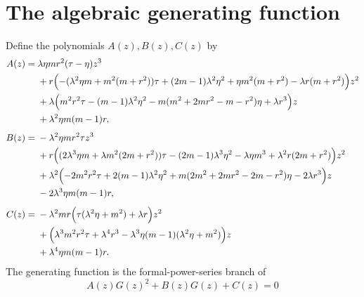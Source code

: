 \documentclass[11pt]{article}
\theoremstyle{remark}
\begin{document}
\section{The algebraic generating function}
\label{sec:algebraic-gf}


Define the polynomials $A(z),B(z),C(z)$ by
\begin{align}
 A(z)={}&\lambda\eta mr^2(\tau-\eta)z^3 \\
 &+r\Bigl(-(\lambda^2\eta m+m^2(m+r^2))\tau
 +(2m-1)\lambda^2\eta^2+\eta m^2(m+r^2)
 -\lambda r(m+r^2)\Bigr)z^2 \\
 &+\lambda\Bigl(m^2r^2\tau-(m-1)\lambda^2\eta^2
 -m(m^2+2mr^2-m-r^2)\eta+\lambda r^3\Bigr)z \\
 &+\lambda^2\eta m(m-1)r,
 \label{eq:A}\\[0.4em]
 B(z)={}&-\lambda^2\eta mr^2\tau z^3 \\
 &+r\Bigl((2\lambda^3\eta m+\lambda m^2(2m+r^2))\tau
 -(2m-1)\lambda^3\eta^2-\lambda\eta m^3
 +\lambda^2r(2m+r^2)\Bigr)z^2 \\
 &+\lambda^2\Bigl(-2m^2r^2\tau+2(m-1)\lambda^2\eta^2
 +m(2m^2+2mr^2-2m-r^2)\eta-2\lambda r^3\Bigr)z \\
 &-2\lambda^3\eta m(m-1)r,
 \label{eq:B}\\[0.4em]
 C(z)={}&-\lambda^2mr\Bigl(\tau(\lambda^2\eta+m^2)+\lambda r\Bigr)z^2 \\
 &+\Bigl(\lambda^3m^2r^2\tau+\lambda^4r^3
 -\lambda^3\eta(m-1)(\lambda^2\eta+m^2)\Bigr)z \\
 &+\lambda^4\eta m(m-1)r.
 \label{eq:C}
\end{align}
The generating function is the formal-power-series branch of
\begin{equation}
 A(z)G(z)^2+B(z)G(z)+C(z)=0
 \label{eq:quadratic}
\end{equation}
\end{document}
